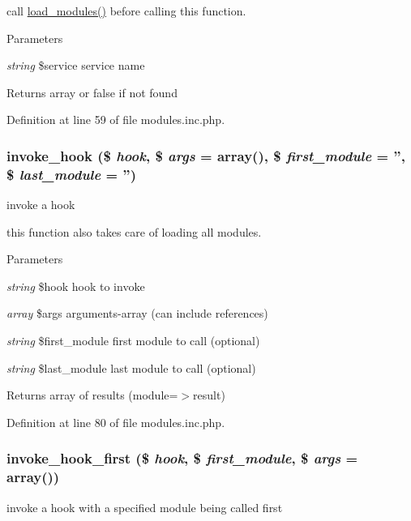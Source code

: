 call \hyperlink{modules_8inc_8php_a23f8be02dc2148a3c860119a1d6ea276}{load\_\-modules()} before calling this function. 
\begin{DoxyParams}{Parameters}
\item[{\em string}]\$service service name \end{DoxyParams}
\begin{DoxyReturn}{Returns}
array or false if not found 
\end{DoxyReturn}


Definition at line 59 of file modules.inc.php.

\hypertarget{modules_8inc_8php_a92ef7c094f294cfec43a3bb53227a21a}{
\subsubsection[{invoke\_\-hook}]{\setlength{\rightskip}{0pt plus 5cm}invoke\_\-hook (\$ {\em hook}, \/  \$ {\em args} = {\ttfamily array()}, \/  \$ {\em first\_\-module} = {\ttfamily ''}, \/  \$ {\em last\_\-module} = {\ttfamily ''})}}
\label{modules_8inc_8php_a92ef7c094f294cfec43a3bb53227a21a}
invoke a hook

this function also takes care of loading all modules. 
\begin{DoxyParams}{Parameters}
\item[{\em string}]\$hook hook to invoke \item[{\em array}]\$args arguments-\/array (can include references) \item[{\em string}]\$first\_\-module first module to call (optional) \item[{\em string}]\$last\_\-module last module to call (optional) \end{DoxyParams}
\begin{DoxyReturn}{Returns}
array of results (module=$>$result) 
\end{DoxyReturn}


Definition at line 80 of file modules.inc.php.

\hypertarget{modules_8inc_8php_acac937809bdb98ce29616134e43050ed}{
\subsubsection[{invoke\_\-hook\_\-first}]{\setlength{\rightskip}{0pt plus 5cm}invoke\_\-hook\_\-first (\$ {\em hook}, \/  \$ {\em first\_\-module}, \/  \$ {\em args} = {\ttfamily array()})}}
\label{modules_8inc_8php_acac937809bdb98ce29616134e43050ed}
invoke a hook with a specified module being called first

